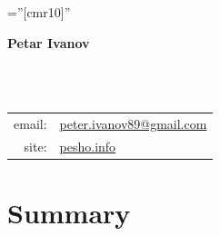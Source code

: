 \documentclass[a4paper,10pt]{article}
\def\name{Petar Ivanov}
\newcommand{\minorcolor}[1]{\textcolor{mygray}{#1}}
\begin{document}
\pagestyle{empty}				%
\font\fb=''[cmr10]''				%

\begin{figure}
	\setlength\fboxsep{0pt}
	\setlength\fboxrule{0.1pt}
        \vspace{-30pt}
\end{figure}

\par{\raggedright\Huge\textbf{\vspace{-3mm}\hspace{0mm}\name}}\\		%
\vspace{-5mm}{\color{linegray}\rule{10.5cm}{0.1mm}}\\

\hspace{4mm}\begin{tabular}{rl}
	\minorcolor{email:} & \href{mailto:peter.ivanov89@gmail.com}{peter.ivanov89@gmail.com}\\
	\minorcolor{site:} & \href{http://pesho.info}{pesho.info}\\
\end{tabular}
\bigskip

\section{Summary}
\hspace{2.5mm}\begin{tabular}{rp{14cm}}
\end{tabular}
\end{document}
